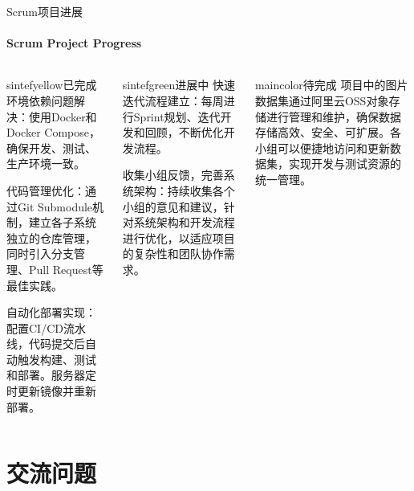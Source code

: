 \documentclass{beamer}
\begin{document}

\begin{frame}[fragile]{Scrum项目进展}
\framesubtitle{Scrum Project Progress}
\begin{columns}
\begin{column}{0.3\textwidth}
\begin{colorblock}[white]{sintefyellow}{已完成}
\footnotesize 环境依赖问题解决：使用Docker和Docker Compose，确保开发、测试、生产环境一致。

\vspace{\baselineskip}

\footnotesize 代码管理优化：通过Git Submodule机制，建立各子系统独立的仓库管理，同时引入分支管理、Pull Request等最佳实践。

\vspace{\baselineskip}

\footnotesize 自动化部署实现：配置CI/CD流水线，代码提交后自动触发构建、测试和部署。服务器定时更新镜像并重新部署。
\end{colorblock}
\end{column}
\begin{column}{0.3\textwidth}
\begin{colorblock}[white]{sintefgreen}{进展中}
\footnotesize 快速迭代流程建立：每周进行Sprint规划、迭代开发和回顾，不断优化开发流程。

\vspace{\baselineskip}

\footnotesize 收集小组反馈，完善系统架构：持续收集各个小组的意见和建议，针对系统架构和开发流程进行优化，以适应项目的复杂性和团队协作需求。

\vspace{5\baselineskip}
\end{colorblock}
\end{column}
\begin{column}{0.3\textwidth}
\begin{colorblock}[white]{maincolor}{待完成}
\footnotesize 项目中的图片数据集通过阿里云OSS对象存储进行管理和维护，确保数据存储高效、安全、可扩展。各小组可以便捷地访问和更新数据集，实现开发与测试资源的统一管理。

\vspace{8\baselineskip}
\end{colorblock}
\end{column}
\end{columns}
\end{frame}


\section{交流问题}
\end{document}

